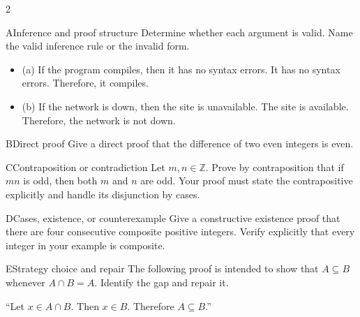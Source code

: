 \documentclass[9pt]{extarticle}
\begin{document}
\CoreWorkArea
\FormBreak
{}
\begin{multicols}{2}
\begin{CoreProblem}{A}{Inference and proof structure}
Determine whether each argument is valid. Name the valid inference rule or the invalid form.
\begin{itemize}
  \item (a) If the program compiles, then it has no syntax errors. It has no syntax errors. Therefore, it compiles.
  \item (b) If the network is down, then the site is unavailable. The site is
        available. Therefore, the network is not down.
\end{itemize}
\end{CoreProblem}
\begin{CoreProblem}{B}{Direct proof}
Give a direct proof that the difference of two even integers is even.
\end{CoreProblem}
\begin{CoreProblem}{C}{Contraposition or contradiction}
Let $m,n\in\mathbb Z$. Prove by contraposition that if $mn$ is odd, then both
$m$ and $n$ are odd. Your proof must state the contrapositive explicitly and
handle its disjunction by cases.
\end{CoreProblem}
\columnbreak
\begin{CoreProblem}{D}{Cases, existence, or counterexample}
Give a constructive existence proof that there are four consecutive composite
positive integers. Verify explicitly that every integer in your example is
composite.
\end{CoreProblem}
\begin{CoreProblem}{E}{Strategy choice and repair}
The following proof is intended to show that $A\subseteq B$ whenever
$A\cap B=A$. Identify the gap and repair it.

``Let $x\in A\cap B$. Then $x\in B$. Therefore $A\subseteq B$.''
\end{CoreProblem}
\end{multicols}
\CoreWorkArea
\FormBreak
{}
\end{document}
